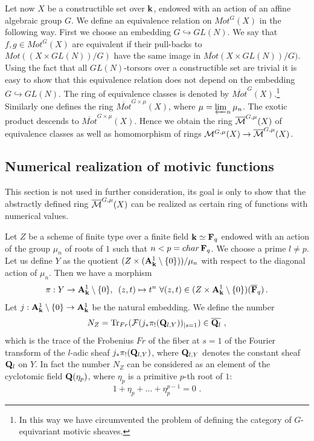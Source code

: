 \documentclass[12pt]{article}
\begin{document}
Let now $X$ be a constructible set over ${\bf k}$, endowed with an action of an affine algebraic group $G$. We define an equivalence relation on $Mot^G(X)$ in the following way. First we choose an embedding $G\hookrightarrow GL(N)$.
We say that $f,g\in Mot^G(X)$ are equivalent if their pull-backs to $Mot((X\times GL(N))/G)$ have the same image in
$\overline{Mot}(X\times GL(N))/G)$. Using the fact that all $GL(N)$-torsors over a constructible set are trivial it is easy to show that this equivalence relation does not depend on the embedding $G\hookrightarrow GL(N)$.
The ring of equivalence classes is denoted by $\overline{Mot}^G(X)$.\footnote{In this way we have circumvented the problem of defining the category of $G$-equivariant motivic sheaves.} Similarly one defines the ring $\overline{Mot}^{G\times \mu}(X)$, where $\mu=\varprojlim_n\mu_n$. The exotic product descends to $\overline{Mot}^{G\times \mu}(X)$. Hence we obtain the ring $\overline{{\cal M}}^{G,\mu}(X)$ of equivalence classes as well as homomorphism of rings ${\cal M}^{G,\mu}(X)\to \overline{{\cal M}}^{G,\mu}(X)$.




\subsection{Numerical realization of motivic functions}


This section is not used in further consideration, its goal is only to show that  the abstractly defined ring 
$\overline{{\cal M}}^{G,\mu}(X)$ can be realized as certain ring of functions with numerical values. 

Let $Z$ be a scheme of finite type over a finite field ${\bf k}\simeq{\bf F}_q$ endowed with an action of the group $\mu_n$ of roots of $1$ such that $n<p=char \, {\bf F}_q$. We choose a prime $l\ne p$. Let us define $Y$ as the quotient
$(Z\times ({\bf A}^1_{{\bf k}}\setminus \{0\}))/\mu_n$ with respect to the diagonal action of $\mu_n$. Then we have a morphism 
$$\pi: Y\to {\bf A}^1_{{\bf k}}\setminus \{0\},\,\,\,(z,t)\mapsto t^n \,\,\forall (z,t)\in (Z\times {\bf A}^1_{{\bf k}}\setminus \{0\})(\overline{\bf F}_q)\,.$$
 Let $j:{\bf A}^1_{{\bf k}}\setminus \{0\}\to {\bf A}^1_{{\bf k}}$ be the natural embedding. We define the number
$$N_Z=\operatorname{Tr}_{Fr}({\cal F}(j_{\ast}\pi_{!}({{\bf Q}}_{l,Y}))_{|s=1})\in \overline{{\bf Q}_{l}}\,\,,$$
which is the trace of the Frobenius $Fr$ of the fiber at $s=1$ of the Fourier transform of the
$l$-adic sheaf $j_{\ast}\pi_{!}({{\bf Q}}_{l,Y})$, where ${{\bf Q}}_{l,Y}$ denotes the constant sheaf ${\bf Q}_l$ on $Y$.
In fact the number $N_Z$ can be considered as an element of the  cyclotomic field ${\bf Q}(\eta_p)$, where
$\eta_p$ is a primitive $p$-th root of $1$:
$$1+\eta_p+\dots+\eta_p^{p-1}=0\,\,.$$
\end{document}
